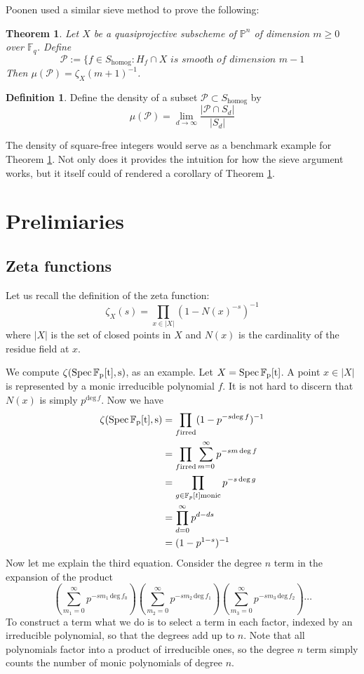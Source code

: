 \documentclass[12pt]{article}
\theoremstyle{plain}
\newtheorem{theorem}[equation]{Theorem}
\theoremstyle{definition}
\newtheorem{definition}[equation]{Definition}
\newcommand{\IF}{\mathbb{F}}
\newcommand{\IP}{\mathbb{P}}
\newcommand{\sP}{\mathcal{P}}
\renewcommand{\deg}{\mathrm{deg}\,}
\newcommand{\Spec}{\rm Spec\,}
\newcommand{\<}{\langle}
\renewcommand{\>}{\rangle}
\begin{document}
Poonen used a similar sieve method to prove the following:
\begin{theorem}
\label{Bertini}
Let $X$ be a quasiprojective subscheme of $\IP^n$ of dimension $m \ge 0$ over $\IF_q$. Define 
$$ \sP := \{ f \in S_{\mathrm{homog}} : H_f \cap X \textit{ is smooth of dimension }m-1 $$
Then $\mu(\sP) = \zeta_X(m + 1)^{-1}$. 
\end{theorem}
\begin{definition}
\label{Pdef}
Define the density of a subset $\sP \subset S_\mathrm{homog}$ by
$$\mu(\sP) = \lim_{d \to \infty} \frac{|\sP \cap S_d|}{|S_d|}$$
\end{definition}
The density of square-free integers would serve as a benchmark example for Theorem \ref{Bertini}. Not only does it provides the intuition for how the sieve argument works, but it itself could of rendered a corollary of Theorem \ref{Bertini}. 

\section{Prelimiaries}
\subsection{Zeta functions}
Let us recall the definition of the zeta function: 
$$ \zeta_X(s) =  \prod_{x \in |X|} (1 - N(x)^{-s})^{-1}$$where $|X|$ is the set of closed points in $X$ and $N(x)$ is the cardinality of the residue field at $x$. 
\par We compute $\zeta(\Spec \IF_p[t], s)$, as an example. Let $X = \Spec \IF_p[t]$. A point $x \in |X|$ is represented by a monic irreducible polynomial $f$. It is not hard to discern that $N(x)$ is simply $p^{\deg f}$. Now we have
\begin{align*}
\zeta(\Spec \IF_p[t], s)  &= \prod_{f \text{irred}} (1 - p^{-s \deg f})^{-1} \\
&= \prod_{f \text{irred}} \sum_{m=0}^\infty p^{-sm \, \deg f}\\
&= \prod_{g \in \IF_p[t] \text{monic}} p^{-s \, \deg g}\\
&= \prod_{d=0}^\infty p^{d - ds}\\
&= (1 - p^{1 - s})^{-1}
\end{align*}
Now let me explain the third equation. Consider the degree $n$ term in the expansion of the product 
$$ (\sum_{m_1=0}^\infty p^{-sm_1 \, \deg f_0})(\sum_{m_2=0}^\infty p^{-sm_2 \, \deg f_1})(\sum_{m_3=0}^\infty p^{-sm_3 \, \deg f_2}) \cdots$$ To construct a term what we do is to select a term in each factor, indexed by an irreducible polynomial, so that the degrees add up to $n$. Note that all polynomials factor into a product of irreducible ones, so the degree $n$ term simply counts the number of monic polynomials of degree $n$. 
\end{document}
